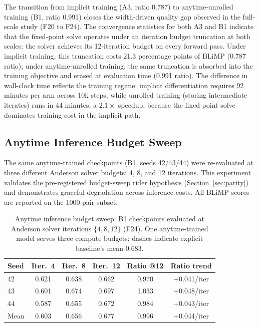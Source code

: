 The transition from implicit training (A3, ratio 0.787) to anytime-unrolled training (B1, ratio 0.991) closes the width-driven quality gap observed in the full-scale study (F20 to F24). The convergence statistics for both A3 and B1 indicate that the fixed-point solve operates under an iteration budget truncation at both scales: the solver achieves its 12-iteration budget on every forward pass. Under implicit training, this truncation costs 21.3 percentage points of BLiMP (0.787 ratio); under anytime-unrolled training, the same truncation is absorbed into the training objective and erased at evaluation time (0.991 ratio). The difference in wall-clock time reflects the training regime: implicit differentiation requires 92 minutes per arm across 10k steps, while unrolled training (storing intermediate iterates) runs in 44 minutes, a $2.1\times$ speedup, because the fixed-point solve dominates training cost in the implicit path.

\subsection{Anytime Inference Budget Sweep}

The same anytime-trained checkpoints (B1, seeds 42/43/44) were re-evaluated at three different Anderson solver budgets: 4, 8, and 12 iterations. This experiment validates the pre-registered budget-sweep rider hypothesis (Section~\ref{sec:parity}) and demonstrates graceful degradation across inference costs. All BLiMP scores are reported on the 1000-pair subset.

\begin{table}[h]
\centering
\small
\caption{Anytime inference budget sweep: B1 checkpoints evaluated at Anderson solver iterations $\{4, 8, 12\}$ (F24). One anytime-trained model serves three compute budgets; dashes indicate explicit baseline's mean 0.683.}
\label{tab:budget_sweep}
\begin{tabular}{@{}lccccc@{}}
\toprule
Seed & Iter.\ 4 & Iter.\ 8 & Iter.\ 12 & Ratio @12 & Ratio trend \\
\midrule
42 & 0.621 & 0.638 & 0.662 & 0.970 & +0.041/iter \\
43 & 0.601 & 0.674 & 0.697 & 1.033 & +0.048/iter \\
44 & 0.587 & 0.655 & 0.672 & 0.984 & +0.043/iter \\
\midrule
Mean & 0.603 & 0.656 & 0.677 & 0.996 & +0.044/iter \\
\bottomrule
\end{tabular}
\end{table}

